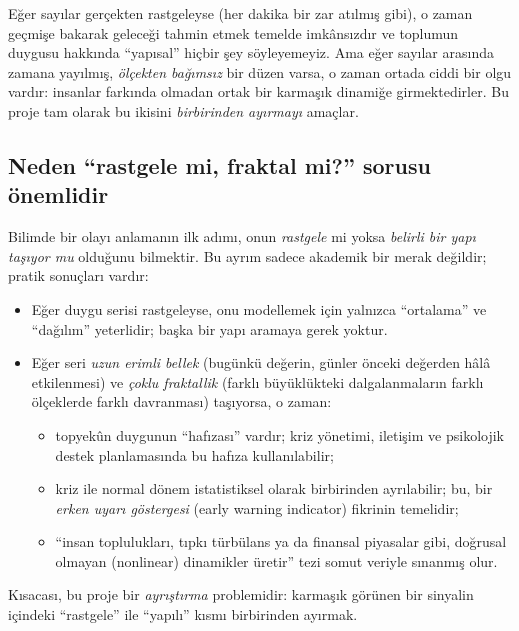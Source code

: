\documentclass[11pt,a4paper]{article}
\begin{document}
Eğer sayılar gerçekten rastgeleyse (her dakika bir zar atılmış gibi), o zaman
geçmişe bakarak geleceği tahmin etmek temelde imkânsızdır ve toplumun duygusu
hakkında ``yapısal'' hiçbir şey söyleyemeyiz. Ama eğer sayılar arasında
zamana yayılmış, \emph{ölçekten bağımsız} bir düzen varsa, o zaman ortada
ciddi bir olgu vardır: insanlar farkında olmadan ortak bir karmaşık dinamiğe
girmektedirler. Bu proje tam olarak bu ikisini \emph{birbirinden ayırmayı}
amaçlar.

\subsection{Neden ``rastgele mi, fraktal mi?'' sorusu önemlidir}

Bilimde bir olayı anlamanın ilk adımı, onun \emph{rastgele} mi yoksa
\emph{belirli bir yapı taşıyor mu} olduğunu bilmektir. Bu ayrım sadece akademik
bir merak değildir; pratik sonuçları vardır:

\begin{itemize}[leftmargin=1.4em]
  \item Eğer duygu serisi rastgeleyse, onu modellemek için yalnızca
        ``ortalama'' ve ``dağılım'' yeterlidir; başka bir yapı aramaya gerek
        yoktur.
  \item Eğer seri \emph{uzun erimli bellek} (bugünkü değerin, günler önceki
        değerden hâlâ etkilenmesi) ve \emph{çoklu fraktallik} (farklı
        büyüklükteki dalgalanmaların farklı ölçeklerde farklı davranması)
        taşıyorsa, o zaman:
        \begin{itemize}
          \item topyekûn duygunun ``hafızası'' vardır; kriz yönetimi,
                iletişim ve psikolojik destek planlamasında bu hafıza
                kullanılabilir;
          \item kriz ile normal dönem istatistiksel olarak birbirinden
                ayrılabilir; bu, bir \emph{erken uyarı göstergesi} (early
                warning indicator) fikrinin temelidir;
          \item ``insan toplulukları, tıpkı türbülans ya da finansal piyasalar
                gibi, doğrusal olmayan (nonlinear) dinamikler üretir'' tezi
                somut veriyle sınanmış olur.
        \end{itemize}
\end{itemize}

Kısacası, bu proje bir \emph{ayrıştırma} problemidir: karmaşık görünen bir
sinyalin içindeki ``rastgele'' ile ``yapılı'' kısmı birbirinden ayırmak.
\end{document}
